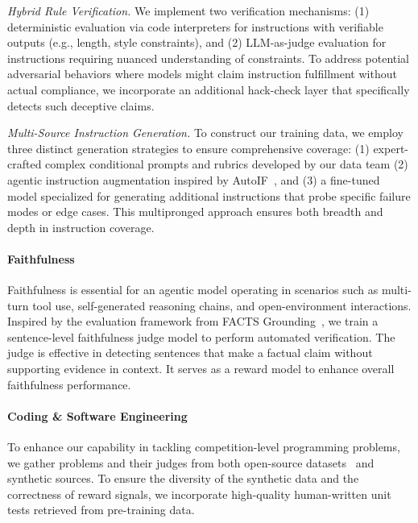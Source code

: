 \noindent\textit{Hybrid Rule Verification.} We implement two verification mechanisms: (1) deterministic evaluation via code interpreters for instructions with verifiable outputs (e.g., length, style constraints), and (2) LLM-as-judge evaluation for instructions requiring nuanced understanding of constraints. To address potential adversarial behaviors where models might claim instruction fulfillment without actual compliance, we incorporate an additional hack-check layer that specifically detects such deceptive claims.

\noindent\textit{Multi-Source Instruction Generation.} To construct our training data, we employ three distinct generation strategies to ensure comprehensive coverage: (1) expert-crafted complex conditional prompts and rubrics developed by our data team (2) agentic instruction augmentation inspired by AutoIF~\citep{dong2024selfplayexecution}, and (3) a fine-tuned model specialized for generating additional instructions that probe specific failure modes or edge cases. This multipronged approach ensures both breadth and depth in instruction coverage.

\paragraph{Faithfulness}

Faithfulness is essential for an agentic model operating in scenarios such as multi-turn tool use, self-generated reasoning chains, and open-environment interactions.
Inspired by the evaluation framework from FACTS Grounding~\citep{jacovi2025factsgroundingleaderboardbenchmarking}, we train a sentence-level faithfulness judge model to perform automated verification. The judge is effective in detecting sentences that make a factual claim without supporting evidence in context. It serves as a reward model to enhance overall faithfulness performance. 

\paragraph{Coding \& Software Engineering}

To enhance our capability in tackling competition-level programming problems, we gather problems and their judges from both open-source datasets~\citep{huang2025opencoderopencookbooktoptier,xu2025kodcodediversechallengingverifiable} and synthetic sources. To ensure the diversity of the synthetic data and the correctness of reward signals, we incorporate high-quality human-written unit tests retrieved from pre-training data. 

